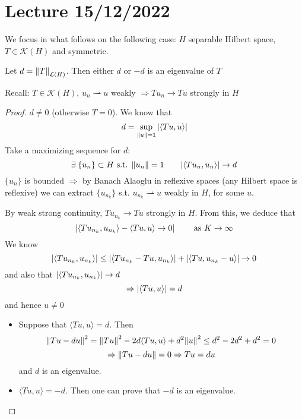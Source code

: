\section{Lecture 15/12/2022}

We focus in what follows on the following case: \(H\) separable Hilbert space, \(T \in \mathcal{K}(H)\) and symmetric.

\begin{proposition}
    Let \(d = \norm{T}_{\mathcal{L}(H)}\). Then either \(d\) or \(-d\) is an eigenvalue of \(T\)
\end{proposition}
Recall: \(T \in \mathcal{K}(H)\), \(u_n \rightharpoonup u\) weakly \(\Rightarrow T u_n \to Tu\) strongly in \(H\)

\begin{proof}
    \(d \neq 0\) (otherwise \(T=0\)). We know that
    \[
        d = \sup_{\norm{u}=1} \abs{\langle Tu, u\rangle}
    \]
    Take a maximizing sequence for \(d\):
    \[
        \exists \; \{u_n\} \subset H \text{ s.t. } \norm{u_n}=1 \qquad \abs{\langle Tu_n, u_n\rangle} \to d    
    \]
    \(\{u_n\}\) is bounded \(\Rightarrow\) by Banach Alaoglu in reflexive spaces (any Hilbert space is reflexive) we can extract \(\{u_{n_k}\}\) s.t. \(u_{n_k} \rightharpoonup u\) weakly in \(H\), for some \(u\).

    By weak strong continuity, \(T u_{n_k} \to Tu\) strongly in \(H\). From this, we deduce that 
    \[
        \abs{ \langle T u_{n_k}, u_{n_k}\rangle - \langle Tu, u\rangle \to 0} \qquad \text{ as } K \to \infty    
    \]
    We know
    \[
        \abs{ \langle Tu_{n_k}, u_{n_k}\rangle} \leq \abs{\langle T u_{n_k} - Tu, u_{n_k}\rangle} + \abs{ \langle Tu, u_{n_k} - u\rangle} \to 0
    \]
    and also that \(\abs{\langle T u_{n_k}, u_{n_k}\rangle} \to d\)
    \[
        \Rightarrow \abs{\langle Tu, u\rangle} = d
    \]
    and hence \(u \neq 0\)

    \begin{itemize}
        \item Suppose that \(\langle Tu, u\rangle = d\). Then
        \[
            \norm{Tu- du}^2 = \norm{Tu}^2 - 2d \langle Tu, u\rangle + d^2 \norm{u}^2 \leq d^2 - 2d^2 + d^2 = 0
        \]
        \[
            \Rightarrow \norm{Tu - du} = 0 \Rightarrow Tu = du
        \]
        and \(d\) is an eigenvalue.
        \item \(\langle Tu, u\rangle = -d\). Then one can prove that \(-d\) is an eigenvalue.
    \end{itemize}
\end{proof}

